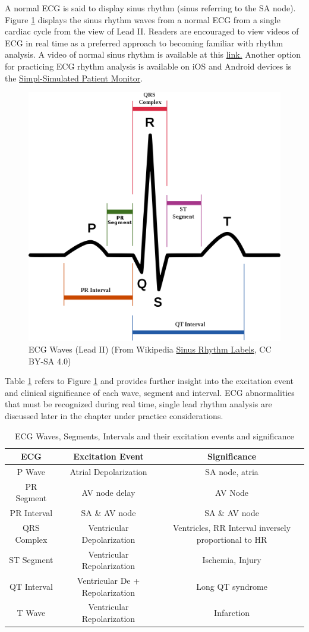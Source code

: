 A normal ECG is said to display sinus rhythm (sinus referring to the SA node). Figure \ref{fig:ECG} displays the sinus rhythm waves from a normal ECG from a single cardiac cycle from the view of Lead II. Readers are encouraged to view videos of ECG in real time as a preferred approach to becoming familiar with rhythm analysis. A video of normal sinus rhythm is available at this \href{https://youtu.be/Q0JMfIVaDUE?list=PLNN6HI4OXQmyOMNWWrQCCQP559lvbcy4b}{link.} Another option for practicing ECG rhythm analysis is available on iOS and Android devices is the \href{https://simplsim.com/}{Simpl-Simulated Patient Monitor}.

\begin{figure}[!h]
    \centering
    \includegraphics[width=0.5\linewidth]{./figure/ECG.png}
    \caption{ECG Waves (Lead II) \footnotesize{(From Wikipedia  \href{https://commons.wikimedia.org/wiki/File:SinusRhythmLabels.svg}{Sinus Rhythm Labels}, CC BY-SA 4.0)}}
    \label{fig:ECG}
\end{figure}

Table \ref{table:ECGWaves} refers to Figure \ref{fig:ECG} and provides further insight into the excitation event and clinical significance of each wave, segment and interval. ECG abnormalities that must be recognized during real time, single lead rhythm analysis are discussed later in the chapter under practice considerations.

\begin{table}[h!]
\centering
\begin{tabular}{||c c c ||} 
 \hline
 ECG & Excitation Event & Significance \\ [0.5ex] 
 \hline\hline
 P Wave & Atrial Depolarization & SA node, atria \\ 
 PR Segment & AV node delay & AV Node  \\
  PR Interval & SA \& AV node & SA \& AV node  \\
 QRS Complex & Ventricular Depolarization & Ventricles, RR Interval inversely proportional to HR  \\
 ST Segment & Ventricular Repolarization & Ischemia, Injury  \\
 QT Interval & Ventricular De + Repolarization & Long QT syndrome  \\ 
 T Wave & Ventricular Repolarization & Infarction \\ [1ex] 
 \hline
\end{tabular}
\caption{ECG Waves, Segments, Intervals and their excitation events and significance}
\label{table:ECGWaves}
\end{table}


